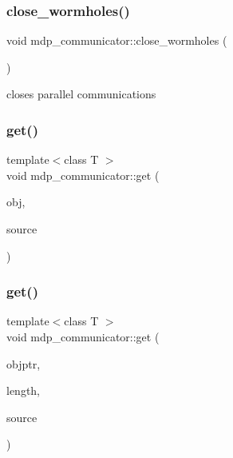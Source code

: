 \subsubsection{\texorpdfstring{close\+\_\+wormholes()}{close\_wormholes()}}
{\footnotesize\ttfamily void mdp\+\_\+communicator\+::close\+\_\+wormholes (\begin{DoxyParamCaption}{ }\end{DoxyParamCaption})\hspace{0.3cm}{\ttfamily [inline]}}



closes parallel communications 

\mbox{\label{classmdp__communicator_a137961f8fefcb8c06df8f58131469ee8}} 
\subsubsection{\texorpdfstring{get()}{get()}\hspace{0.1cm}{\footnotesize\ttfamily [1/2]}}
{\footnotesize\ttfamily template$<$class T $>$ \\
void mdp\+\_\+communicator\+::get (\begin{DoxyParamCaption}\item[{T \&}]{obj,  }\item[{int}]{source }\end{DoxyParamCaption})\hspace{0.3cm}{\ttfamily [inline]}}

\mbox{\label{classmdp__communicator_ae977d9b2fe506a601bb8fc38ed09c571}} 
\subsubsection{\texorpdfstring{get()}{get()}\hspace{0.1cm}{\footnotesize\ttfamily [2/2]}}
{\footnotesize\ttfamily template$<$class T $>$ \\
void mdp\+\_\+communicator\+::get (\begin{DoxyParamCaption}\item[{T $\ast$}]{objptr,  }\item[{\hyperlink{mdp__global__vars_8h_aaa1ad9d0dcd2124aa5af0120d9954174}{mdp\+\_\+int}}]{length,  }\item[{int}]{source }\end{DoxyParamCaption})\hspace{0.3cm}{\ttfamily [inline]}}

